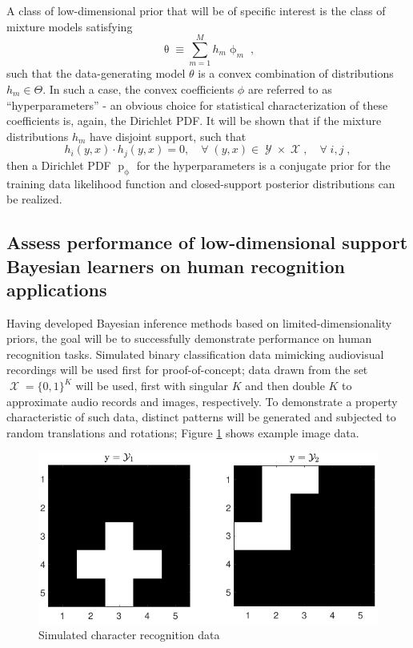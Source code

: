 \documentclass[12pt]{article}
\DeclareMathOperator{\prm}{\mathrm{p}}
\DeclareMathOperator{\Xcal}{\mathcal{X}}
\DeclareMathOperator{\Ycal}{\mathcal{Y}}
\begin{document}
A class of low-dimensional prior that will be of specific interest is the class of mixture models satisfying
\begin{equation}
\uptheta \equiv \sum_{m = 1}^M h_m \upphi_m \;,
\end{equation}
such that the data-generating model $\theta$ is a convex combination of distributions $h_m \in \Theta$. In such a case, the convex coefficients $\phi$ are referred to as ``hyperparameters'' - an obvious choice for statistical characterization of these coefficients is, again, the Dirichlet PDF. It will be shown that if the mixture distributions $h_m$ have disjoint support, such that
\begin{equation}
h_i(y,x) \cdot h_j(y,x) = 0, \quad \forall \; (y,x) \in \Ycal \times \Xcal, \quad \forall \; i,j \;,
\end{equation}
then a Dirichlet PDF $\prm_{\upphi}$ for the hyperparameters is a conjugate prior for the training data likelihood function and closed-support posterior distributions can be realized.





\subsection{Assess performance of low-dimensional support Bayesian learners on human recognition applications}

Having developed Bayesian inference methods based on limited-dimensionality priors, the goal will be to successfully demonstrate performance on human recognition tasks. Simulated binary classification data mimicking audiovisual recordings will be used first for proof-of-concept; data drawn from the set $\Xcal = \{0,1\}^K$ will be used, first with singular $K$ and then double $K$ to approximate audio records and images, respectively. To demonstrate a property characteristic of such data, distinct patterns will be generated and subjected to random translations and rotations; Figure \ref{fig:character_sim_ex} shows example image data.
\begin{figure}
\centering
\includegraphics[width=0.8\linewidth]{character_sim_ex.pdf}
\caption{Simulated character recognition data}
\label{fig:character_sim_ex}
\end{figure}
\end{document}
